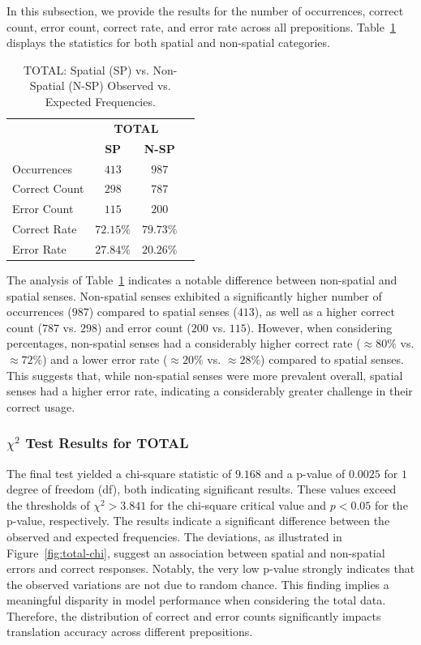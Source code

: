In this subsection, we provide the results for the number of occurrences, correct count, error count, correct rate, and error rate across all prepositions. Table~\ref{tab:total} displays the statistics for both spatial and non-spatial categories.

\begin{table}[htb]
\centering
\begin{tabular}{@{}lccc@{}} \\
\toprule
& \multicolumn{2}{c}{\textbf{TOTAL}} \\ 
& \textbf{SP} & \textbf{N-SP} \\
\midrule
Occurrences & $413$ & $987$ \\
Correct Count & $298$ & $787$ \\
Error Count & $115$ & $200$ \\
\midrule
Correct Rate & $72.15\%$ & $\mathbf{79.73\%}$ \\
\midrule
Error Rate & $\mathbf{27.84\%}$ & $20.26\%$ \\
\bottomrule
\end{tabular}
\caption{TOTAL: Spatial (SP) vs. Non-Spatial (N-SP) Observed vs. Expected Frequencies.} \label{tab:total} 
\end{table}

The analysis of Table~\ref{tab:total} indicates a notable difference between non-spatial and spatial senses. Non-spatial senses exhibited a significantly higher number of occurrences ($987$) compared to spatial senses ($413$), as well as a higher correct count ($787$ vs. $298$) and error count ($200$ vs. $115$). However, when considering percentages, non-spatial senses had a considerably higher correct rate ($\approx80\%$ vs. $\approx72\%$) and a lower error rate ($\approx20\%$ vs. $\approx28\%$) compared to spatial senses. This suggests that, while non-spatial senses were more prevalent overall, spatial senses had a higher error rate, indicating a considerably greater challenge in their correct usage.


\subsubsection{$\chi^2$ Test Results for TOTAL} 

The final test yielded a chi-square statistic of $9.168$ and a p-value of $0.0025$ for $1$ degree of freedom (df), both indicating significant results. These values exceed the thresholds of $\chi^2 > 3.841$ for the chi-square critical value and $p < 0.05$ for the p-value, respectively. The results indicate a significant difference between the observed and expected frequencies. The deviations, as illustrated in Figure~\ref{fig:total-chi}, suggest an association between spatial and non-spatial errors and correct responses. Notably, the very low p-value strongly indicates that the observed variations are not due to random chance. This finding implies a meaningful disparity in model performance when considering the total data. Therefore, the distribution of correct and error counts significantly impacts translation accuracy across different prepositions.

